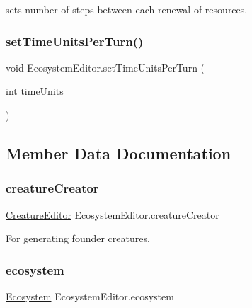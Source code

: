 sets number of steps between each renewal of resources. 

\mbox{\label{class_ecosystem_editor_a5012174c9ae01075e7749739f2700f69}} 
\subsubsection{\texorpdfstring{set\+Time\+Units\+Per\+Turn()}{setTimeUnitsPerTurn()}}
{\footnotesize\ttfamily void Ecosystem\+Editor.\+set\+Time\+Units\+Per\+Turn (\begin{DoxyParamCaption}\item[{int}]{time\+Units }\end{DoxyParamCaption})}



\subsection{Member Data Documentation}
\mbox{\label{class_ecosystem_editor_ae07c75810b8d9ff769bf1cd552786138}} 
\subsubsection{\texorpdfstring{creature\+Creator}{creatureCreator}}
{\footnotesize\ttfamily \mbox{\hyperlink{class_creature_editor}{Creature\+Editor}} Ecosystem\+Editor.\+creature\+Creator}



For generating founder creatures. 

\mbox{\label{class_ecosystem_editor_a49e0702cf9757efdf05a098336737890}} 
\subsubsection{\texorpdfstring{ecosystem}{ecosystem}}
{\footnotesize\ttfamily \mbox{\hyperlink{class_ecosystem}{Ecosystem}} Ecosystem\+Editor.\+ecosystem}



